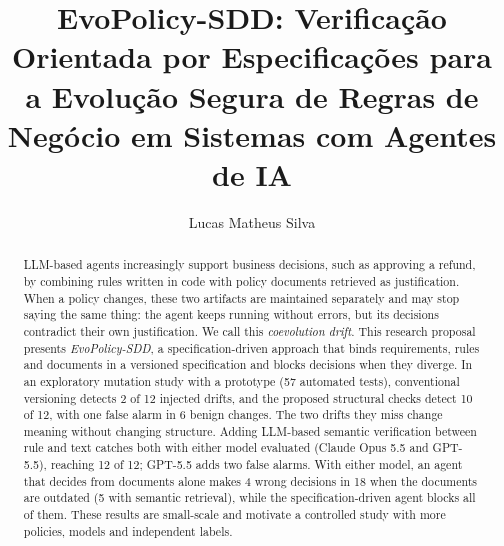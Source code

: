 \documentclass[12pt]{article}
\title{EvoPolicy-SDD: Verificação Orientada por Especificações para a Evolução Segura de Regras de Negócio em Sistemas com Agentes de IA}
\author{Lucas Matheus Silva\inst{1}}
\begin{document}
\maketitle
\sloppy

\begin{abstract}
LLM-based agents increasingly support business decisions, such as approving a refund, by combining rules written in code with policy documents retrieved as justification. When a policy changes, these two artifacts are maintained separately and may stop saying the same thing: the agent keeps running without errors, but its decisions contradict their own justification. We call this \textit{coevolution drift}. This research proposal presents \textit{EvoPolicy-SDD}, a specification-driven approach that binds requirements, rules and documents in a versioned specification and blocks decisions when they diverge. In an exploratory mutation study with a prototype (57 automated tests), conventional versioning detects 2 of 12 injected drifts, and the proposed structural checks detect 10 of 12, with one false alarm in 6 benign changes. The two drifts they miss change meaning without changing structure. Adding LLM-based semantic verification between rule and text catches both with either model evaluated (Claude Opus 5.5 and GPT-5.5), reaching 12 of 12; GPT-5.5 adds two false alarms. With either model, an agent that decides from documents alone makes 4 wrong decisions in 18 when the documents are outdated (5 with semantic retrieval), while the specification-driven agent blocks all of them. These results are small-scale and motivate a controlled study with more policies, models and independent labels.
\end{abstract}
\end{document}
